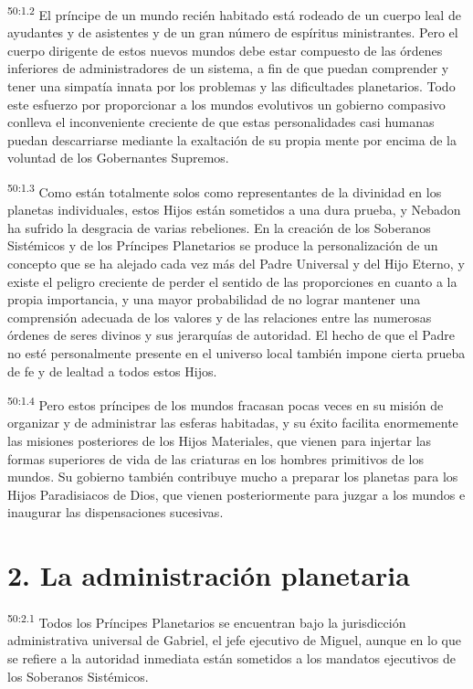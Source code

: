 \par
\textsuperscript{50:1.2} El príncipe de un mundo recién habitado está rodeado de un cuerpo leal de ayudantes y de asistentes y de un gran número de espíritus ministrantes. Pero el cuerpo dirigente de estos nuevos mundos debe estar compuesto de las órdenes inferiores de administradores de un sistema, a fin de que puedan comprender y tener una simpatía innata por los problemas y las dificultades planetarios. Todo este esfuerzo por proporcionar a los mundos evolutivos un gobierno compasivo conlleva el inconveniente creciente de que estas personalidades casi humanas puedan descarriarse mediante la exaltación de su propia mente por encima de la voluntad de los Gobernantes Supremos.

\par
\textsuperscript{50:1.3} Como están totalmente solos como representantes de la divinidad en los planetas individuales, estos Hijos están sometidos a una dura prueba, y Nebadon ha sufrido la desgracia de varias rebeliones. En la creación de los Soberanos Sistémicos y de los Príncipes Planetarios se produce la personalización de un concepto que se ha alejado cada vez más del Padre Universal y del Hijo Eterno, y existe el peligro creciente de perder el sentido de las proporciones en cuanto a la propia importancia, y una mayor probabilidad de no lograr mantener una comprensión adecuada de los valores y de las relaciones entre las numerosas órdenes de seres divinos y sus jerarquías de autoridad. El hecho de que el Padre no esté personalmente presente en el universo local también impone cierta prueba de fe y de lealtad a todos estos Hijos.

\par
\textsuperscript{50:1.4} Pero estos príncipes de los mundos fracasan pocas veces en su misión de organizar y de administrar las esferas habitadas, y su éxito facilita enormemente las misiones posteriores de los Hijos Materiales, que vienen para injertar las formas superiores de vida de las criaturas en los hombres primitivos de los mundos. Su gobierno también contribuye mucho a preparar los planetas para los Hijos Paradisiacos de Dios, que vienen posteriormente para juzgar a los mundos e inaugurar las dispensaciones sucesivas.

\section*{2. La administración planetaria}
\par
\textsuperscript{50:2.1} Todos los Príncipes Planetarios se encuentran bajo la jurisdicción administrativa universal de Gabriel, el jefe ejecutivo de Miguel, aunque en lo que se refiere a la autoridad inmediata están sometidos a los mandatos ejecutivos de los Soberanos Sistémicos.


